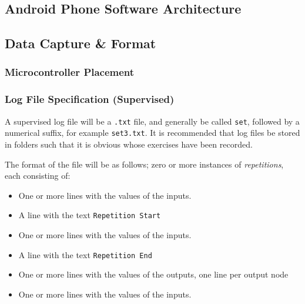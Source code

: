 \documentclass[a4paper]{article}
\begin{document}

\subsection{Android Phone Software Architecture}%


\subsection{Data Capture \& Format}%


\subsubsection{Microcontroller Placement}


\subsubsection{Log File Specification (Supervised)}

A supervised log file will be a \lstinline{.txt} file, and generally be called \lstinline{set}, followed by a numerical suffix, for example \lstinline{set3.txt}. It is recommended that log files be stored in folders such that it is obvious whose exercises have been recorded.

The format of the file will be as follows; zero or more instances of \emph{repetitions}, each consisting of:

\begin{itemize}
\item One or more lines with the values of the inputs.
\item A line with the text \lstinline{Repetition Start}
\item One or more lines with the values of the inputs.
\item A line with the text \lstinline{Repetition End}
\item One or more lines with the values of the outputs, one line per output node
\item One or more lines with the values of the inputs.
\end{itemize}
\end{document}
